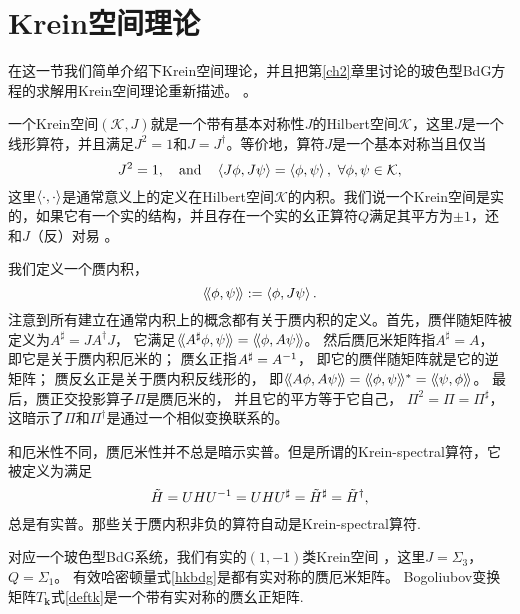 \section{Krein空间理论}\label{ksf}

在这一节我们简单介绍下Krein空间理论，并且把第\ref{ch2}章里讨论的玻色型BdG方程的求解用Krein空间理论重新描述。 \cite{Peano2018,Bender2019,Lein2019}。

一个Krein空间$(\mathcal K,J)$就是一个带有基本对称性$J$的Hilbert空间$\mathcal K$，这里$J$是一个线形算符，并且满足$J^2=1$和$J=J^\dagger$。等价地，算符$J$是一个基本对称当且仅当
\begin{equation}
	J^2=1, \qand \expval{J\phi,J\psi}=\expval{\phi,\psi},\ \forall \phi,\psi\in \mathcal K,\nonumber
\end{equation}
这里$\expval{\cdot,\cdot}$是通常意义上的定义在Hilbert空间$\mathcal K$的内积。我们说一个Krein空间是实的，如果它有一个实的结构，并且存在一个实的幺正算符$Q$满足其平方为$\pm 1$，还和$J$（反）对易 \cite{SchulzBaldes2016}。

我们定义一个赝内积，
\begin{equation}
	\langle\!\langle \phi,\psi \rangle\!\rangle := \expval{\phi,J \psi}. \label{defkip}
\end{equation}
注意到所有建立在通常内积上的概念都有关于赝内积的定义。首先，赝伴随矩阵被定义为$A^\sharp=J A^\dagger J$，
它满足$\langle\!\langle A^\sharp \phi,\psi \rangle\!\rangle=\langle\!\langle \phi,A\psi \rangle\!\rangle$。
然后赝厄米矩阵指$A^\sharp=A$，
即它是关于赝内积厄米的；
赝幺正指$A^\sharp=A^{-1}$，
即它的赝伴随矩阵就是它的逆矩阵；
赝反幺正是关于赝内积反线形的，
即$\langle\!\langle A\phi,A\psi \rangle\!\rangle=\langle\!\langle \phi,\psi \rangle\!\rangle^*=\langle\!\langle \psi,\phi \rangle\!\rangle$。
最后，赝正交投影算子$\Pi$是赝厄米的，
并且它的平方等于它自己，
$\Pi^2=\Pi=\Pi^\sharp$，
这暗示了$\Pi$和$\Pi^\dagger$是通过一个相似变换联系的。

和厄米性不同，赝厄米性并不总是暗示实普。但是所谓的Krein-spectral算符，它被定义为满足
\begin{equation}
	\tilde H=UHU^{-1} =UHU^\sharp=\tilde H^\sharp =\tilde H^\dagger,\nonumber
\end{equation}
总是有实普。那些关于赝内积非负的算符自动是Krein-spectral算符\cite{Peano2018,Colpa1978}.

对应一个玻色型BdG系统，我们有实的$(1,-1)$类Krein空间 \cite{SchulzBaldes2016}，这里$J=\Sigma_3$，
$Q=\Sigma_1$。
有效哈密顿量式\eqref{hkbdg}是都有实对称的赝厄米矩阵。
Bogoliubov变换矩阵$T_{\boldsymbol k}$式\eqref{deftk}是一个带有实对称的赝幺正矩阵.

